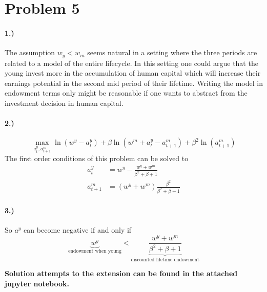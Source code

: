 
\section*{Problem 5}

\paragraph{1.)}

The assumption $w_y < w_m$ seems natural in a setting where the three periods
are related to a model of the entire lifecycle. In this setting one could argue
that the young invest more in the accumulation of human capital which will
increase their earnings potential in the second mid period of their
lifetime. Writing the model in endowment terms only might be reasonable if one
wants to abstract from the investment decision in human capital. 

\paragraph{2.)}

\begin{equation*}
  \max_{a_t^y, a_{t+1}^m} \ln(w^y - a_t^y) + \beta \ln(w^m + a_t^y - a_{t+1}^m)
  + \beta^2 \ln(a_{t+1}^m)
\end{equation*}
The first order conditions of this problem can be solved to
\begin{align*}
  a_t^y &= w^y - \frac{w^y + w^m}{\beta^2 + \beta + 1} \\
  a_{t+1}^m &= (w^y + w^m) \frac{\beta^2}{\beta^2 + \beta + 1}
\end{align*}

\paragraph{3.)}

So $a^y$ can become negative if and only if
\begin{equation*}
  \underbrace{w^y}_{\text{endowment when young}} < \underbrace{\frac{w^y +
      w^m}{\beta^2 + \beta + 1}}_{\text{discounted lifetime endowment}}
\end{equation*}

\textbf{Solution attempts to the extension can be found in the attached jupyter
notebook.}


